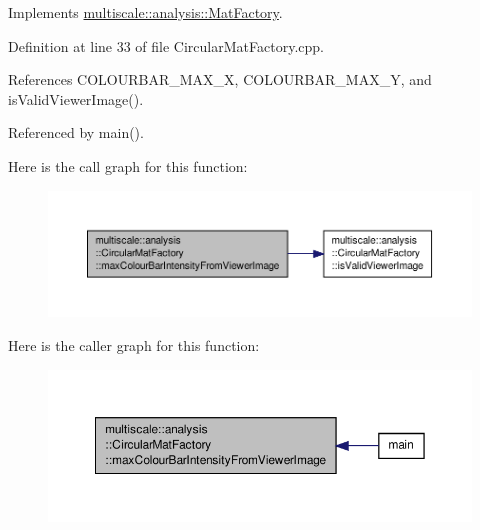 Implements \hyperlink{classmultiscale_1_1analysis_1_1MatFactory_a041b354357794476a2108e3f71deadc8}{multiscale\-::analysis\-::\-Mat\-Factory}.



Definition at line 33 of file Circular\-Mat\-Factory.\-cpp.



References C\-O\-L\-O\-U\-R\-B\-A\-R\-\_\-\-M\-A\-X\-\_\-\-X, C\-O\-L\-O\-U\-R\-B\-A\-R\-\_\-\-M\-A\-X\-\_\-\-Y, and is\-Valid\-Viewer\-Image().



Referenced by main().



Here is the call graph for this function\-:\nopagebreak
\begin{figure}[H]
\begin{center}
\leavevmode
\includegraphics[width=350pt]{classmultiscale_1_1analysis_1_1CircularMatFactory_aea41720f6adfb983bb94ea0a45789874_cgraph}
\end{center}
\end{figure}




Here is the caller graph for this function\-:\nopagebreak
\begin{figure}[H]
\begin{center}
\leavevmode
\includegraphics[width=350pt]{classmultiscale_1_1analysis_1_1CircularMatFactory_aea41720f6adfb983bb94ea0a45789874_icgraph}
\end{center}
\end{figure}


